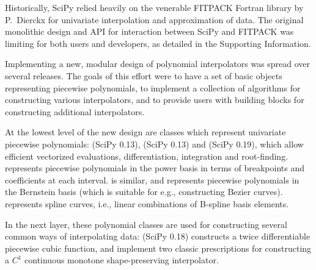 Historically, SciPy relied heavily on the venerable FITPACK
Fortran library by P.~Dierckx \cite{Dierckx:1993:CSF:151103, FITPACK} for
univariate interpolation and approximation of data. The original monolithic
design and API for interaction between SciPy and FITPACK was limiting for both
users and developers, as detailed in the Supporting Information.

Implementing a new, modular design of polynomial interpolators was spread over
several releases. The goals of this effort were to have a set of basic objects
representing piecewise polynomials, to implement a collection of algorithms
for constructing various interpolators, and to provide users with building
blocks for constructing additional interpolators.

At the lowest level of the new design are classes which represent univariate
piecewise polynomials:  (SciPy 0.13)\cite{scipy-gh2885},
 (SciPy 0.13) and  (SciPy 0.19)\cite{scipy-gh3174},
which allow
efficient vectorized evaluations, differentiation, integration and root-finding.
 represents piecewise polynomials in the power basis in terms of
breakpoints and coefficients at each interval.  is similar, and
represents piecewise polynomials in the Bernstein basis (which is suitable
for e.g., constructing Bezier curves).  represents spline
curves, i.e., linear combinations of B-spline basis elements.\cite{deBoor1978} 

In the next layer, these polynomial classes are used for constructing several
common ways of interpolating data:  (SciPy 0.18)
\cite{scipy-gh5653} constructs a twice 
differentiable piecewise cubic function,  
and  implement two classic prescriptions for
constructing a $C^1$ continuous monotone shape-preserving interpolator.
\cite{FritschCarlson1980, Akima1970}
